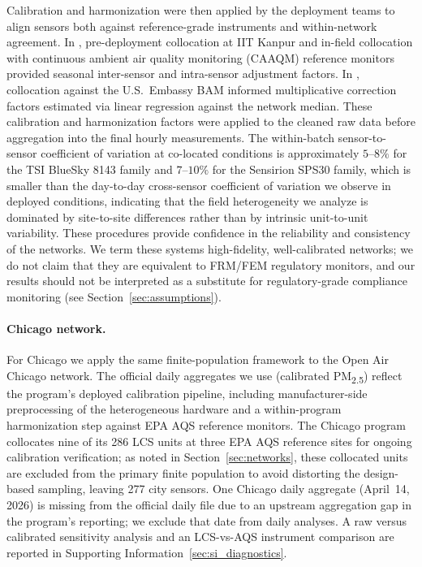\documentclass[12pt]{article}
\theoremstyle{remark}
\newcommand{\pmtt}{\textrm{PM\textsubscript{2.5}}}
\newcommand{\city}[1]{\capitalisewords{\MakeLowercase{#1}}}
\begin{document}
Calibration and harmonization were then applied by the deployment teams to align sensors both against reference-grade instruments and within-network agreement. In \city{Lucknow}, pre-deployment collocation at IIT Kanpur and in-field collocation with continuous ambient air quality monitoring (CAAQM) reference monitors provided seasonal inter-sensor and intra-sensor adjustment factors.\supercite{jain_hybrid_2024} In \city{Dhaka}, collocation against the U.S.\ Embassy BAM informed multiplicative correction factors estimated via linear regression against the network median.\supercite{zaman_comparison_2025} These calibration and harmonization factors were applied to the cleaned raw data before aggregation into the final hourly measurements. The within-batch sensor-to-sensor coefficient of variation at co-located conditions is approximately $5$--$8\%$ for the TSI BlueSky 8143 family and $7$--$10\%$ for the Sensirion SPS30 family,\supercite{jain_hybrid_2024,zaman_comparison_2025} which is smaller than the day-to-day cross-sensor coefficient of variation we observe in deployed conditions, indicating that the field heterogeneity we analyze is dominated by site-to-site differences rather than by intrinsic unit-to-unit variability. These procedures provide confidence in the reliability and consistency of the networks. We term these systems high-fidelity, well-calibrated networks; we do not claim that they are equivalent to FRM/FEM regulatory monitors, and our results should not be interpreted as a substitute for regulatory-grade compliance monitoring (see Section~\ref{sec:assumptions}).

\paragraph{Chicago network.} For Chicago we apply the same finite-population framework to the Open Air Chicago network. The official daily aggregates we use (calibrated \pmtt) reflect the program's deployed calibration pipeline, including manufacturer-side preprocessing of the heterogeneous hardware and a within-program harmonization step against EPA AQS reference monitors. The Chicago program collocates nine of its 286 LCS units at three EPA AQS reference sites for ongoing calibration verification; as noted in Section~\ref{sec:networks}, these collocated units are excluded from the primary finite population to avoid distorting the design-based sampling, leaving 277 city sensors. One Chicago daily aggregate (April~14, 2026) is missing from the official daily file due to an upstream aggregation gap in the program's reporting; we exclude that date from daily analyses. A raw versus calibrated sensitivity analysis and an LCS-vs-AQS instrument comparison are reported in Supporting Information~\ref{sec:si_diagnostics}.
\end{document}

